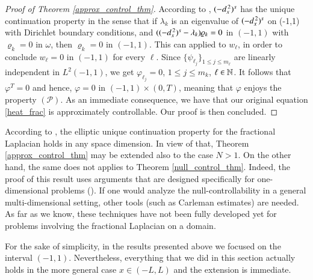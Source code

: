 \begin{proof}[Proof of Theorem \ref{approx_control_thm}]
According to \cite[Theorem 1.4]{fall2014unique}, $(-d_x^{\,2})^{s}$ has the unique continuation property in the sense that if $\lambda_k$ is an eigenvalue of $(-d_x^{\,2})^{s}$ on (-1,1) with Dirichlet boundary conditions, and $((-d_x^{\,2})^{s}-\lambda_k)\varrho_k = 0$ in $(-1,1)$ with $\varrho_k = 0$ in $\omega$, then $\varrho_k = 0$ in $(-1,1)$. 
This can applied to $w_{\ell}$, in order to conclude $w_{\ell} = 0$ in $(-1,1)$ for every $\ell$. Since $\{\psi_{\ell_j}\}_{1\leq j\leq m_{\ell}}$ are linearly independent in $L^2(-1,1)$, we get $\varphi_{\ell_j} = 0$, $1\leq j\leq m_k$, $\ell\in\mathbb{N}$. It follows that $\varphi^T=0$ and hence, $\varphi=0$ in $(-1,1)\times(0,T)$, meaning that $\varphi$ enjoys the property $(\mathcal{P})$. As an immediate consequence, we have that our original equation \eqref{heat_frac} is approximately controllable. Our proof is then concluded. 
\end{proof}

\begin{remark}
According to \cite{fall2014unique}, the elliptic unique continuation property for the fractional Laplacian holds in any space dimension. In view of that, Theorem \ref{approx_control_thm} may be extended also to the case $N>1$. On the other hand, the same does not applies to Theorem \eqref{null_control_thm}. Indeed, the proof of this result uses arguments that are designed specifically for one-dimensional problems (\cite{fattorini1971exact}). If one would analyze the null-controllability in a general multi-dimensional setting, other tools (such as Carleman estimates) are needed. As far as we know, these techniques have not been fully developed yet for problems involving the fractional Laplacian on a domain. 
\end{remark}

\begin{remark}
For the sake of simplicity, in the results presented above we focused on the interval $(-1,1)$. Nevertheless, everything that we did in this section actually holds in the more general case $x\in(-L,L)$ and the extension is immediate.
\end{remark}



